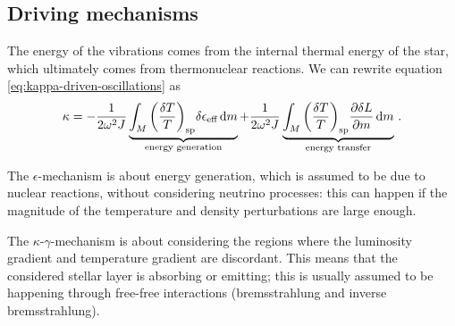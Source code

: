 \documentclass[main.tex]{subfiles}
\begin{document}
\subsection{Driving mechanisms}

The energy of the vibrations comes from the internal thermal energy of the star, which ultimately comes from thermonuclear reactions. We can rewrite equation \eqref{eq:kappa-driven-oscillations} as 
%
\begin{align} \label{eq:kappa-driving-mechanisms}
\kappa = - \frac{1}{2 \omega^2 J} \underbrace{\int_{M} \qty(\frac{ \delta T}{T})_{\text{sp}} \delta \epsilon _{\text{eff}} \dd{m}}_{\text{energy generation}}
+ \frac{1}{2 \omega^2J} \underbrace{\int_{M} \qty(\frac{ \delta T}{T})_{\text{sp}}
\pdv{ \delta L}{m} \dd{m}}_{\text{energy transfer}}
\,.
\end{align}

The \(\epsilon \)-mechanism is about energy generation, which is assumed to be due to nuclear reactions, without considering neutrino processes:
this can happen if the magnitude of the temperature and density perturbations are large enough.

The \(\kappa \)-\(\gamma \)-mechanism is about considering the regions where the luminosity gradient and temperature gradient are discordant.
This means that the considered stellar layer is absorbing or emitting; this is usually assumed to be happening through free-free interactions (bremsstrahlung and inverse bremsstrahlung).
\end{document}
